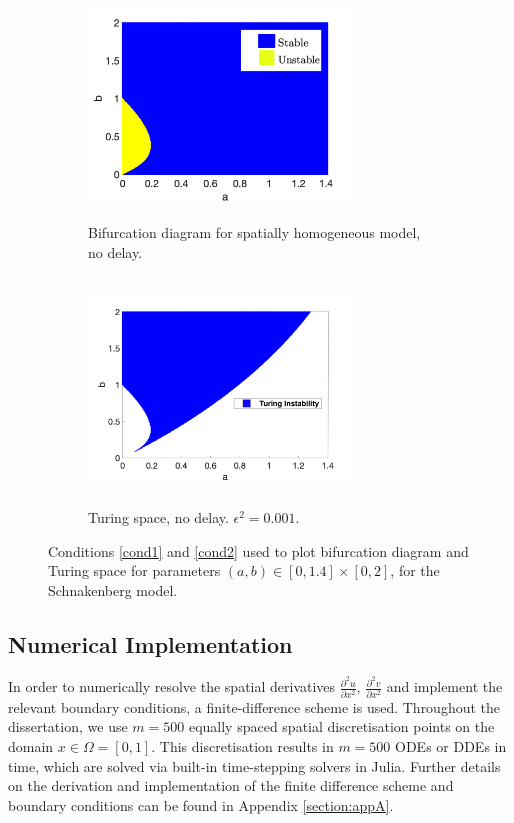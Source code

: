 \begin{figure}[H]
    \centering
    \begin{subfigure}[t]{0.45\textwidth}
        \centering
        \includegraphics[width=7cm,height = 6cm]{bifsh1.png}
        \caption{Bifurcation diagram for spatially homogeneous model, no delay.}
        \label{fig:bifsh}
    \end{subfigure}
    \hfill
    \begin{subfigure}[t]{0.45\textwidth}
        \centering
        \includegraphics[width=7cm,height = 6cm]{turingspace.png}
        \caption{Turing space, no delay. $\epsilon^2=0.001$.}
        \label{fig:turingspace}
    \end{subfigure}
    \caption{Conditions \eqref{cond1} and \eqref{cond2} used to plot bifurcation diagram and Turing space for parameters $(a,b)\in[0,1.4]\times[0,2]$, for the Schnakenberg model.}
    \label{fig:dispfixed}
\end{figure}

\subsection{Numerical Implementation}\label{section:numimp}
In order to numerically resolve the spatial derivatives $\frac{\partial^2 u}{\partial x^2}$, $\frac{\partial^2 v}{\partial x^2}$ and implement the relevant boundary conditions, a finite-difference scheme is used. Throughout the dissertation, we use $m=500$ equally spaced spatial discretisation points on the domain $x\in\Omega=[0,1]$. This discretisation results in $m=500$ ODEs or DDEs in time, which are solved via built-in time-stepping solvers in Julia. Further details on the derivation and implementation of the finite difference scheme and boundary conditions can be found in Appendix \ref{section:appA}.

